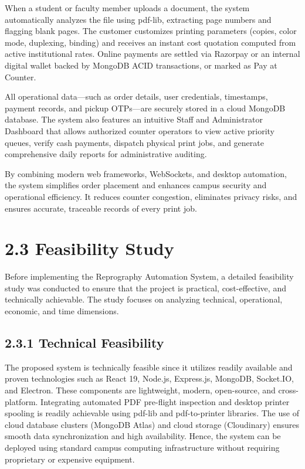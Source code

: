 \documentclass[12pt,a4paper]{report}
\begin{document}
When a student or faculty member uploads a document, the system automatically analyzes the file using pdf-lib, extracting page numbers and flagging blank pages. The customer customizes printing parameters (copies, color mode, duplexing, binding) and receives an instant cost quotation computed from active institutional rates. Online payments are settled via Razorpay or an internal digital wallet backed by MongoDB ACID transactions, or marked as Pay at Counter.

All operational data---such as order details, user credentials, timestamps, payment records, and pickup OTPs---are securely stored in a cloud MongoDB database. The system also features an intuitive Staff and Administrator Dashboard that allows authorized counter operators to view active priority queues, verify cash payments, dispatch physical print jobs, and generate comprehensive daily reports for administrative auditing.

By combining modern web frameworks, WebSockets, and desktop automation, the system simplifies order placement and enhances campus security and operational efficiency. It reduces counter congestion, eliminates privacy risks, and ensures accurate, traceable records of every print job.

\section{2.3 Feasibility Study}
Before implementing the Reprography Automation System, a detailed feasibility study was conducted to ensure that the project is practical, cost-effective, and technically achievable. The study focuses on analyzing technical, operational, economic, and time dimensions.

\subsection{2.3.1 Technical Feasibility}
The proposed system is technically feasible since it utilizes readily available and proven technologies such as React 19, Node.js, Express.js, MongoDB, Socket.IO, and Electron. These components are lightweight, modern, open-source, and cross-platform. Integrating automated PDF pre-flight inspection and desktop printer spooling is readily achievable using pdf-lib and pdf-to-printer libraries. The use of cloud database clusters (MongoDB Atlas) and cloud storage (Cloudinary) ensures smooth data synchronization and high availability. Hence, the system can be deployed using standard campus computing infrastructure without requiring proprietary or expensive equipment.
\end{document}
